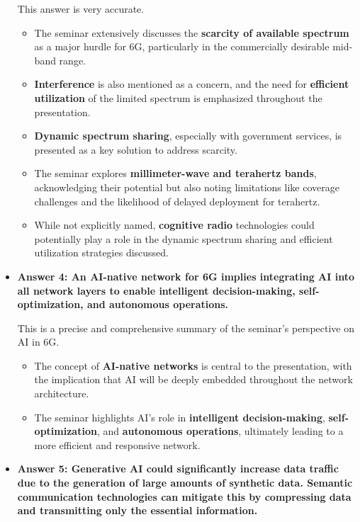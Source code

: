 \documentclass[
]{article}
\begin{document}
\begin{itemize}
  This answer is very accurate.

  \begin{itemize}
  
  \item
    The seminar extensively discusses the \textbf{scarcity of available
    spectrum} as a major hurdle for 6G, particularly in the commercially
    desirable mid-band range.
  \item
    \textbf{Interference} is also mentioned as a concern, and the need
    for \textbf{efficient utilization} of the limited spectrum is
    emphasized throughout the presentation.
  \item
    \textbf{Dynamic spectrum sharing}, especially with government
    services, is presented as a key solution to address scarcity.
  \item
    The seminar explores \textbf{millimeter-wave and terahertz bands},
    acknowledging their potential but also noting limitations like
    coverage challenges and the likelihood of delayed deployment for
    terahertz.
  \item
    While not explicitly named, \textbf{cognitive radio} technologies
    could potentially play a role in the dynamic spectrum sharing and
    efficient utilization strategies discussed.
  \end{itemize}
\item
  \textbf{Answer 4: An AI-native network for 6G implies integrating AI
  into all network layers to enable intelligent decision-making,
  self-optimization, and autonomous operations.}

  This is a precise and comprehensive summary of the seminar's
  perspective on AI in 6G.

  \begin{itemize}
  
  \item
    The concept of \textbf{AI-native networks} is central to the
    presentation, with the implication that AI will be deeply embedded
    throughout the network architecture.
  \item
    The seminar highlights AI's role in \textbf{intelligent
    decision-making}, \textbf{self-optimization}, and \textbf{autonomous
    operations}, ultimately leading to a more efficient and responsive
    network.
  \end{itemize}
\item
  \textbf{Answer 5: Generative AI could significantly increase data
  traffic due to the generation of large amounts of synthetic data.
  Semantic communication technologies can mitigate this by compressing
  data and transmitting only the essential information.}


\end{itemize}
\end{document}
